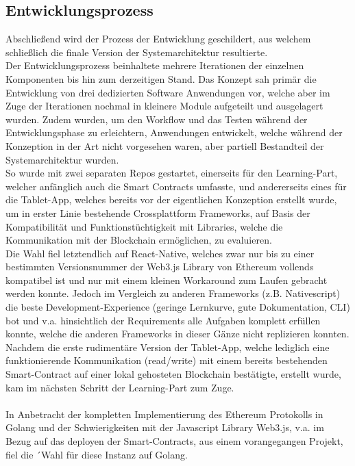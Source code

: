 \subsection{Entwicklungsprozess}
Abschließend wird der Prozess der Entwicklung geschildert, aus welchem schließlich die finale Version der Systemarchitektur resultierte. \\
Der Entwicklungsprozess beinhaltete mehrere Iterationen der einzelnen Komponenten bis hin zum derzeitigen Stand. Das Konzept sah primär die Entwicklung von drei dedizierten Software Anwendungen vor, welche aber im Zuge der Iterationen nochmal in kleinere Module aufgeteilt und ausgelagert wurden. Zudem wurden, um den Workflow und das Testen während der Entwicklungsphase zu erleichtern, Anwendungen entwickelt, welche während der Konzeption in der Art nicht vorgesehen waren, aber partiell Bestandteil der Systemarchitektur wurden. \\
So wurde mit zwei separaten Repos gestartet, einerseits für den Learning-Part, welcher anfänglich auch die Smart Contracts umfasste, und andererseits eines für die Tablet-App, welches bereits vor der eigentlichen Konzeption erstellt wurde, um in erster Linie bestehende Crossplattform Frameworks, auf Basis der Kompatibilität und Funktionstüchtigkeit mit Libraries, welche die Kommunikation mit der Blockchain ermöglichen, zu evaluieren. \\
Die Wahl fiel letztendlich auf React-Native, welches zwar nur bis zu einer bestimmten Versionsnummer der Web3.js Library von Ethereum vollends kompatibel ist und nur mit einem kleinen Workaround zum Laufen gebracht werden konnte.
Jedoch im Vergleich zu anderen Frameworks (z.B. Nativescript) die beste Development-Experience (geringe Lernkurve, gute Dokumentation, CLI) bot und v.a. hinsichtlich der Requirements alle Aufgaben komplett erfüllen konnte, welche die anderen Frameworks in dieser Gänze nicht replizieren konnten. \\
Nachdem die erste rudimentäre Version der Tablet-App, welche lediglich eine funktionierende Kommunikation (read/write) mit einem bereits bestehenden Smart-Contract auf einer lokal gehosteten Blockchain bestätigte, erstellt wurde, kam im nächsten Schritt der Learning-Part zum Zuge. \\\\
In Anbetracht der kompletten Implementierung des Ethereum Protokolls in Golang und der Schwierigkeiten mit der Javascript Library Web3.js, v.a. im Bezug auf das deployen der Smart-Contracts, aus einem vorangegangen Projekt, fiel die ´Wahl für diese Instanz auf Golang. \\
